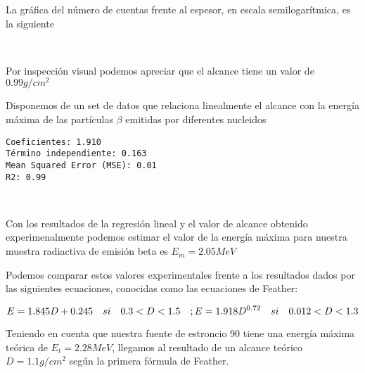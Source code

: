\documentclass[11pt]{article}
\begin{document}
La gráfica del número de cuentas frente al espesor, en escala
semilogarítmica, es la siguiente

    \begin{center}
    \end{center}
    { \hspace*{\fill} \\}
     
            
    
    Por inspección visual podemos apreciar que el alcance tiene un valor de
\(0.99g/cm^2\)

    

    Disponemos de un set de datos que relaciona linealmente el alcance con
la energía máxima de las partículas \(\beta\) emitidas por diferentes
nucleidos

    \begin{Verbatim}[commandchars=\\\{\}]
Coeficientes: 1.910
Término independiente: 0.163
Mean Squared Error (MSE): 0.01
R2: 0.99
    \end{Verbatim}

    \begin{center}
    \end{center}
    { \hspace*{\fill} \\}
     
            
    
    Con los resultados de la regresión lineal y el valor de alcance obtenido
experimenalmente podemos estimar el valor de la energía máxima para
nuestra muestra radiactiva de emisión beta es \(E_m = 2.05MeV\)

    

    Podemos comparar estos valores experimentales frente a los resultados
dados por las siguientes ecuaciones, conocidas como las ecuaciones de
Feather:

\[
E = 1.845D + 0.245 \quad si \quad 0.3<D<1.5 \quad ;  \quad \\
E = 1.918D^{0.72} \quad si \quad 0.012<D<1.3
\]
 
            
    
    Teniendo en cuenta que nuestra fuente de estroncio 90 tiene una energía
máxima teórica de \(E_t = 2.28 MeV\), llegamos al resultado de un
alcance teórico \(D = 1.1g/cm^2\) según la primera fórmula de Feather.
\end{document}
